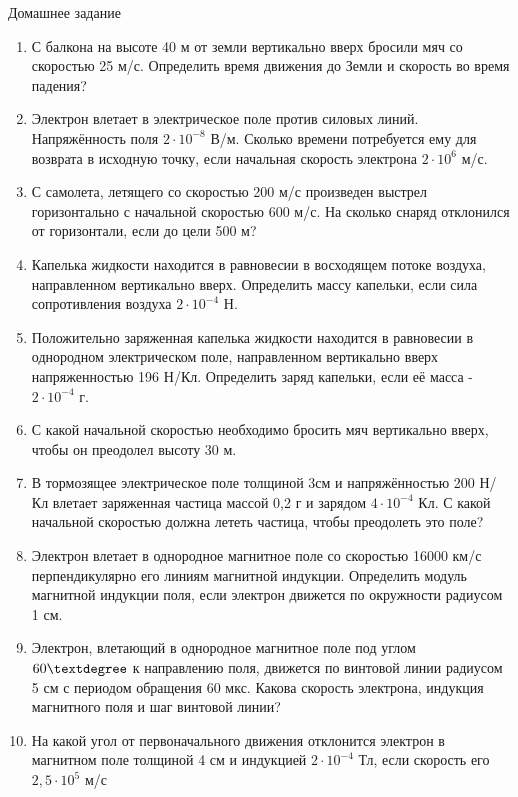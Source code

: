 \documentclass[a6paper, 11pt]{diss_4}
\renewcommand{\'}{\,'}
\begin{document}
\begin{center}
   Домашнее задание
\end{center}
\begin{enumerate}

\item С балкона на высоте 40 м от земли вертикально вверх бросили мяч со скоростью 25 м/с. Определить время движения до Земли и скорость во время падения?

\item Электрон влетает в электрическое поле против силовых линий. Напряжённость поля $2\cdot10^{-8}$ В/м. Сколько времени потребуется ему для возврата в исходную точку, если начальная скорость электрона $2\cdot10^6$ м/с.

\item С самолета, летящего со скоростью 200 м/с произведен выстрел горизонтально с начальной скоростью 600 м/с. На сколько снаряд отклонился от горизонтали, если до цели  500 м?

\item Капелька жидкости находится в равновесии в восходящем потоке воздуха, направленном  вертикально вверх. Определить массу капельки, если сила сопротивления воздуха $2\cdot10^{-4}$ Н.

\item Положительно заряженная капелька жидкости находится в равновесии в однородном электрическом поле, направленном  вертикально вверх напряженностью  196 Н/Кл. Определить заряд капельки, если её масса  - $2\cdot10^{-4}$ г.

\item С какой начальной скоростью необходимо бросить мяч вертикально вверх, чтобы он преодолел высоту 30 м.

\item В тормозящее электрическое поле толщиной 3см и напряжённостью 200 Н/Кл влетает заряженная частица массой 0,2 г и зарядом
$4\cdot10^{-4}$ Кл. С какой начальной скоростью должна лететь частица, чтобы преодолеть это поле?

\item Электрон влетает в однородное магнитное поле со скоростью 16000 км/с перпендикулярно его линиям магнитной индукции. Определить модуль магнитной индукции поля, если электрон движется по окружности радиусом 1 см.

\item Электрон, влетающий в однородное магнитное поле под углом $60\textdegree$ к направлению поля, движется по винтовой линии радиусом 5 см с периодом обращения 60 мкс. Какова скорость электрона, индукция магнитного поля и шаг винтовой линии?

\item На какой угол от первоначального движения отклонится электрон в магнитном поле толщиной 4 см и индукцией $2\cdot10^{-4}$ Тл, если скорость его $2,5\cdot10^5$ м/с

\end{enumerate}
\end{document}
